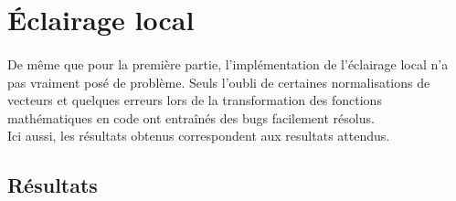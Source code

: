 \documentclass{article}
\begin{document}
\section{Éclairage local}
\paragraph*{}
De même que pour la première partie, l'implémentation de l'éclairage local n'a
pas vraiment posé de problème. Seuls l'oubli de certaines normalisations de vecteurs
et quelques erreurs lors de la transformation des fonctions mathématiques en code
ont entraînés des bugs facilement résolus.\\
Ici aussi, les résultats obtenus correspondent aux resultats attendus.

\subsection*{Résultats}
\end{document}
